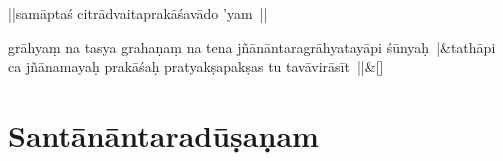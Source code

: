 \documentclass[article,12pt,a4paper]{memoir}%
\newcounter{parCount}
\begin{document}
	  
	  \pstart \leavevmode%
	||samāptaś citrādvaitaprakāśavādo 'yam ||
	{}
	\pend%
      
	    
	    \stanza[\smallbreak]
	  grāhyaṃ na tasya grahaṇaṃ na tena jñānāntaragrāhyatayāpi śūnyaḥ |&tathāpi ca jñānamayaḥ prakāśaḥ pratyakṣapakṣas tu tavāvirāsīt ||\&[\smallbreak]
	  
	  
	  
	    
	    \endnumbering%
	    
	  
	  
	
	    
	    \beginnumbering%
	    
	  
\chapter[{Santānāntaradūṣaṇam}][{Santānāntaradūṣaṇam}]{Santānāntaradūṣaṇam}\label{Santānāntaradūṣaṇam}
\end{document}
